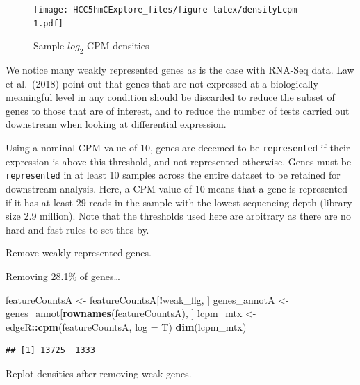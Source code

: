 \documentclass[
]{book}
\newenvironment{Shaded}{\begin{snugshade}}{\end{snugshade}}
\newcommand{\DataTypeTok}[1]{\textcolor[rgb]{0.13,0.29,0.53}{#1}}
\newcommand{\KeywordTok}[1]{\textcolor[rgb]{0.13,0.29,0.53}{\textbf{#1}}}
\newcommand{\NormalTok}[1]{#1}
\newcommand{\OperatorTok}[1]{\textcolor[rgb]{0.81,0.36,0.00}{\textbf{#1}}}
\newcommand{\StringTok}[1]{\textcolor[rgb]{0.31,0.60,0.02}{#1}}
\begin{document}
\begin{figure}
\centering
\texttt{[image: HCC5hmCExplore\_files/figure-latex/densityLcpm-1.pdf]}
\caption{\label{fig:densityLcpm}Sample \(log_2\) CPM densities}
\end{figure}

We notice many weakly represented genes as is the case with RNA-Seq data.
Law et al.~(2018) \citep{Law:2018aa} point out that genes that are not expressed at a biologically
meaningful level in any condition should be discarded to reduce the
subset of genes to those that are of interest, and to reduce the number of tests
carried out downstream when looking at differential expression.

Using a nominal CPM value of 10, genes are deeemed to be \texttt{represented}
if their expression is above this threshold, and not represented otherwise.
Genes must be \texttt{represented} in at least 10 samples across the entire
dataset to be retained for downstream analysis. Here, a CPM value of 10
means that a gene is represented if it has at least 29
reads in the sample with the lowest sequencing depth
(library size 2.9 million). Note that the thresholds
used here are arbitrary as there are no hard and fast rules to set thes by.

Remove weakly represented genes.

Removing 28.1\% of genes\ldots{}

\begin{Shaded}
\begin{Highlighting}[]
\NormalTok{featureCountsA <{-}}\StringTok{ }\NormalTok{featureCountsA[}\OperatorTok{!}\NormalTok{weak\_flg, ]}
\NormalTok{genes\_annotA <{-}}\StringTok{ }\NormalTok{genes\_annot[}\KeywordTok{rownames}\NormalTok{(featureCountsA), ]}
\NormalTok{lcpm\_mtx <{-}}\StringTok{ }\NormalTok{edgeR}\OperatorTok{::}\KeywordTok{cpm}\NormalTok{(featureCountsA, }\DataTypeTok{log =}\NormalTok{ T)}
\KeywordTok{dim}\NormalTok{(lcpm\_mtx)}
\end{Highlighting}
\end{Shaded}

\begin{verbatim}
## [1] 13725  1333
\end{verbatim}

Replot densities after removing weak genes.
\end{document}

